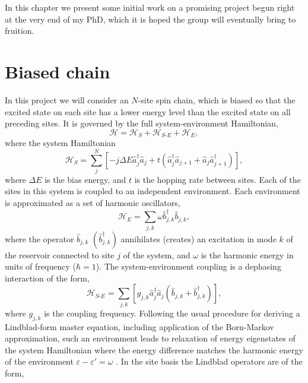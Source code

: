 In this chapter we present some initial work on a promising project begun right at the very end of my PhD, which it is hoped the group will eventually bring to fruition. 

\section{Biased chain}
In this project we will consider an \(N\)-site spin chain, which is biased so that the excited state on each site has a lower energy level than the excited state on all preceding sites. It is governed by the full system-environment Hamiltonian,
\begin{equation}
	\mathcal{H} = \mathcal{H}_{S} + \mathcal{H}_{S\text{-}E} + \mathcal{H}_{E},
	\label{eq:fw1-0}
\end{equation}
where the system Hamiltonian
\begin{equation}
	\mathcal{H}_{S} = \sum_{j}^{N}\left[ -j \Delta E \hat{a}_{j}^{\dagger}\hat{a}_{j} + t\left( \hat{a}_{j}^{\dagger}\hat{a}_{j+1} + \hat{a}_{j}\hat{a}_{j+1}^{\dagger}\right)\right],
	\label{eq:fw1-1}
\end{equation}
where \(\Delta E\) is the bias energy, and \(t\) is the hopping rate between sites. Each of the sites in this system is coupled to an independent environment. Each environment is approximated as a set of harmonic oscillators,
\begin{equation}
	\mathcal{H}_{E} = \sum_{j,k} \omega\hat{b}_{j,k}^{\dagger}\hat{b}_{j,k},
	\label{eq:fw1-3}
\end{equation}
where the operator \(\hat{b}_{j,k}\) \((\hat{b}_{j,k}^{\dagger})\) annihilates (creates) an excitation in mode \(k\) of the reservoir connected to site \(j\) of the system, and \(\omega\) is the harmonic energy in units of frequency (\(\hbar = 1\)). The system-environment coupling is a dephasing interaction of the form,
\begin{equation}
	\mathcal{H}_{S\text{-}E} = \sum_{j,k} \left[ g_{j,k}\hat{a}_{j}^{\dagger}\hat{a}_{j}\left( \hat{b}_{j,k} + \hat{b}_{j,k}^{\dagger} \right)\right],
	\label{eq:fw1-4}
\end{equation}
where \(g_{j,k}\) is the coupling frequency. Following the usual procedure for deriving a Lindblad-form master equation, including application of the Born-Markov approximation, such an environment leads to relaxation of energy eigenstates of the system Hamiltonian where the energy difference matches the harmonic energy of the environment \(\varepsilon - \varepsilon' = \omega\) \cite{Beaudoin2011}. In the site basis the Lindblad operators are of the form,
